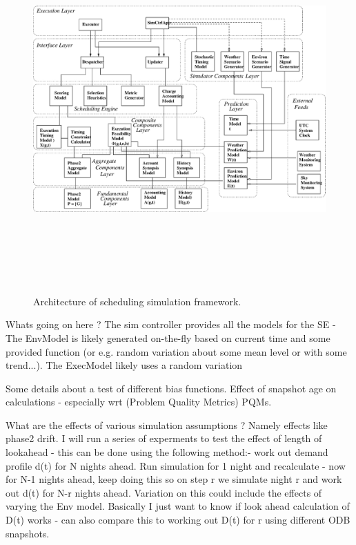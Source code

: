 \begin{landscape}
   \begin{figure}[htp]
   \begin{center}
   \includegraphics[height=14cm]{figures/sca.eps}
   \end{center}
   \label{fig:simframewrk} 
   \caption[Scheduling simulation framework.] 
   {Architecture of scheduling simulation framework.}
   \end{figure} 
\end{landscape}

Whats going on here ? The sim controller provides all the models for the SE - The EnvModel is likely generated on-the-fly based on current time and some provided function (or e.g. random variation about some mean level or with some trend...). The ExecModel likely uses a random variation


Some details about a test of different bias functions.
Effect of snapshot age on calculations - especially wrt (Problem Quality Metrics) PQMs.

What are the effects of various simulation assumptions ? Namely effects like phase2 drift. I will run a series of experments to test the effect of length of lookahead - this can be done using the following method:-
work out demand profile d(t) for N nights ahead. Run simulation for 1 night and recalculate - now for N-1 nights ahead, keep doing this so on step r we simulate night r and work out d(t) for N-r nights ahead. Variation on this could include the effects of varying the Env model. Basically I just want to know if look ahead calculation of D(t) works - can also compare this to working out D(t) for r using different ODB snapshots.

